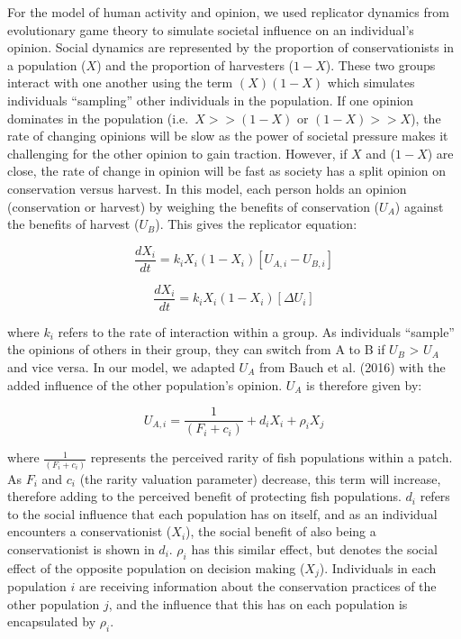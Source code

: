 \documentclass[
]{article}
\begin{document}
For the model of human activity and opinion, we used replicator dynamics from evolutionary game theory to simulate societal influence on an individual's opinion. Social dynamics are represented by the proportion of conservationists in a population (\(X\)) and the proportion of harvesters (\(1-X\)). These two groups interact with one another using the term \((X)(1-X)\) which simulates individuals ``sampling'' other individuals in the population. If one opinion dominates in the population (i.e.~\(X >> (1-X)\) or \((1-X) >> X\)), the rate of changing opinions will be slow as the power of societal pressure makes it challenging for the other opinion to gain traction. However, if \(X\) and (\(1-X\)) are close, the rate of change in opinion will be fast as society has a split opinion on conservation versus harvest. In this model, each person holds an opinion (conservation or harvest) by weighing the benefits of conservation (\(U_A\)) against the benefits of harvest (\(U_B\)). This gives the replicator equation:

\begin{equation} 
\frac{dX_i}{dt} = k_iX_i(1-X_i)[U_{A,i} - U_{B,i}]
  \label{eq:rep1}
\end{equation}

\begin{equation} 
\frac{dX_i}{dt} = k_iX_i(1-X_i)[\Delta U_i]
  \label{eq:rep2}
\end{equation}

where \(k_i\) refers to the rate of interaction within a group. As individuals ``sample'' the opinions of others in their group, they can switch from A to B if \(U_B\) \textgreater{} \(U_A\) and vice versa. In our model, we adapted \(U_A\) from Bauch et al. (2016) with the added influence of the other population's opinion. \(U_A\) is therefore given by:

\begin{equation} 
U_{A,i} = \frac{1}{(F_i + c_i)} + d_iX_i + \rho_i X_j
  \label{eq:pros1}
\end{equation}

where \(\frac{1}{(F_i + c_i)}\) represents the perceived rarity of fish populations within a patch. As \(F_i\) and \(c_i\) (the rarity valuation parameter) decrease, this term will increase, therefore adding to the perceived benefit of protecting fish populations. \(d_i\) refers to the social influence that each population has on itself, and as an individual encounters a conservationist (\(X_i\)), the social benefit of also being a conservationist is shown in \(d_i\). \(\rho_i\) has this similar effect, but denotes the social effect of the opposite population on decision making (\(X_j\)). Individuals in each population \(i\) are receiving information about the conservation practices of the other population \(j\), and the influence that this has on each population is encapsulated by \(\rho_i\).
\end{document}
